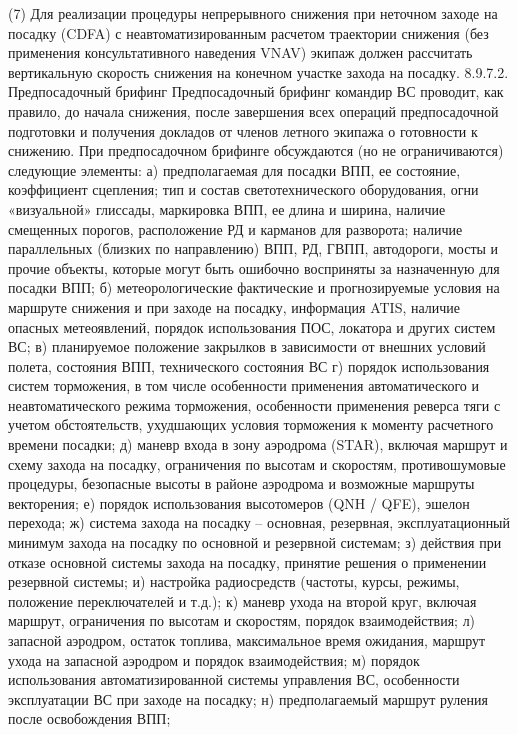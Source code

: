 (7) Для реализации процедуры непрерывного снижения при неточном заходе на посадку (CDFA) с неавтоматизированным расчетом траектории снижения (без применения консультативного наведения VNAV) экипаж должен рассчитать вертикальную скорость снижения на конечном участке захода на посадку.
8.9.7.2.	Предпосадочный брифинг
Предпосадочный брифинг командир ВС проводит, как правило, до начала снижения, после завершения всех операций предпосадочной подготовки и получения докладов от членов летного экипажа о готовности к снижению.
При предпосадочном брифинге обсуждаются (но не ограничиваются) следующие элементы:
а)	предполагаемая для посадки ВПП, ее состояние, коэффициент сцепления; тип и состав светотехнического оборудования, огни «визуальной» глиссады, маркировка ВПП, ее длина и ширина, наличие смещенных порогов, расположение РД и карманов для разворота; наличие параллельных (близких по направлению) ВПП, РД, ГВПП, автодороги, мосты и прочие объекты, которые могут быть ошибочно восприняты за назначенную для посадки ВПП;
б)	метеорологические фактические и прогнозируемые условия на маршруте снижения и при заходе на посадку, информация ATIS, наличие опасных метеоявлений, порядок использования ПОС, локатора и других систем ВС;
в)	планируемое положение закрылков в зависимости от внешних условий полета, состояния ВПП, технического состояния ВС
г)	порядок использования систем торможения, в том числе особенности применения автоматического и неавтоматического режима торможения, особенности применения реверса тяги с учетом обстоятельств, ухудшающих условия торможения к моменту расчетного времени посадки;
д)	маневр входа в зону аэродрома (STAR), включая маршрут и схему захода на посадку, ограничения по высотам и скоростям, противошумовые процедуры, безопасные высоты в районе аэродрома и возможные маршруты векторения;
е)	порядок использования высотомеров (QNH / QFE), эшелон перехода;
ж)	система захода на посадку – основная, резервная, эксплуатационный минимум захода на посадку по основной и резервной системам;
з)	действия при отказе основной системы захода на посадку, принятие решения о применении резервной системы; 
и)	настройка радиосредств (частоты, курсы, режимы, положение переключателей и т.д.);
к)	маневр ухода на второй круг, включая маршрут, ограничения по высотам и скоростям, порядок взаимодействия;
л)	запасной аэродром, остаток топлива, максимальное время ожидания, маршрут ухода на запасной аэродром и порядок взаимодействия;
м)	порядок использования автоматизированной системы управления ВС, особенности эксплуатации ВС при заходе на посадку;
н)	предполагаемый маршрут руления после освобождения ВПП;
